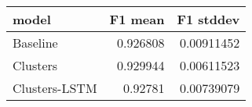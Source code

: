 \begin{tabular}{lrr}
\toprule
 model         &   F1 mean &   F1 stddev \\
\midrule
 Baseline      &  0.926808 &  0.00911452 \\
 Clusters      &  0.929944 &  0.00611523 \\
 Clusters-LSTM &  0.92781  &  0.00739079 \\
\bottomrule
\end{tabular}
